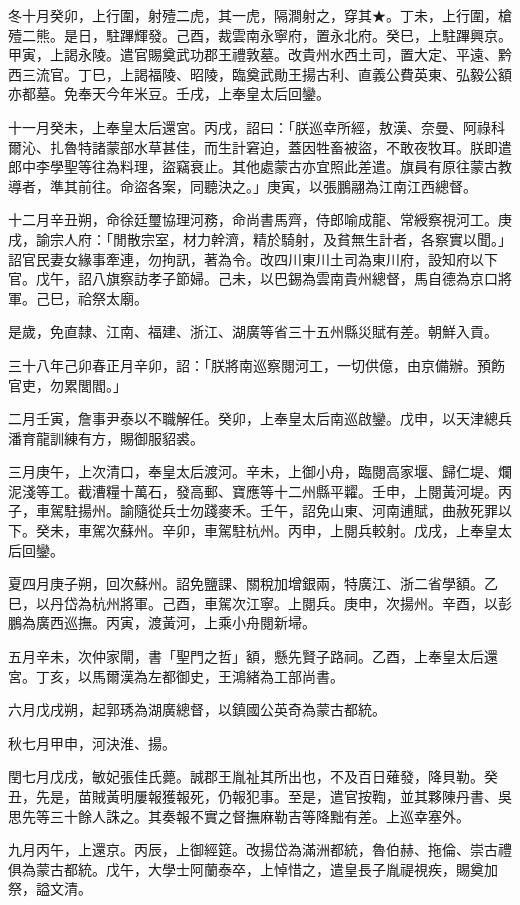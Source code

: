 \begin{pinyinscope}
冬十月癸卯，上行圍，射殪二虎，其一虎，隔澗射之，穿其★。丁未，上行圍，槍殪二熊。是日，駐蹕輝發。己酉，裁雲南永寧府，置永北府。癸巳，上駐蹕興京。甲寅，上謁永陵。遣官賜奠武功郡王禮敦墓。改貴州水西土司，置大定、平遠、黔西三流官。丁巳，上謁福陵、昭陵，臨奠武勛王揚古利、直義公費英東、弘毅公額亦都墓。免奉天今年米豆。壬戌，上奉皇太后回鑾。

十一月癸未，上奉皇太后還宮。丙戌，詔曰：「朕巡幸所經，敖漢、奈曼、阿祿科爾沁、扎魯特諸蒙部水草甚佳，而生計窘迫，蓋因牲畜被盜，不敢夜牧耳。朕即遣郎中李學聖等往為料理，盜竊衰止。其他處蒙古亦宜照此差遣。旗員有原往蒙古教導者，準其前往。命盜各案，同聽決之。」庚寅，以張鵬翮為江南江西總督。

十二月辛丑朔，命徐廷璽協理河務，命尚書馬齊，侍郎喻成龍、常綬察視河工。庚戌，諭宗人府：「閒散宗室，材力幹濟，精於騎射，及貧無生計者，各察實以聞。」詔官民妻女緣事牽連，勿拘訊，著為令。改四川東川土司為東川府，設知府以下官。戊午，詔八旗察訪孝子節婦。己未，以巴錫為雲南貴州總督，馬自德為京口將軍。己巳，祫祭太廟。

是歲，免直隸、江南、福建、浙江、湖廣等省三十五州縣災賦有差。朝鮮入貢。

三十八年己卯春正月辛卯，詔：「朕將南巡察閱河工，一切供億，由京備辦。預飭官吏，勿累閭閻。」

二月壬寅，詹事尹泰以不職解任。癸卯，上奉皇太后南巡啟鑾。戊申，以天津總兵潘育龍訓練有方，賜御服貂裘。

三月庚午，上次清口，奉皇太后渡河。辛未，上御小舟，臨閱高家堰、歸仁堤、爛泥淺等工。截漕糧十萬石，發高郵、寶應等十二州縣平糶。壬申，上閱黃河堤。丙子，車駕駐揚州。諭隨從兵士勿踐麥禾。壬午，詔免山東、河南逋賦，曲赦死罪以下。癸未，車駕次蘇州。辛卯，車駕駐杭州。丙申，上閱兵較射。戊戌，上奉皇太后回鑾。

夏四月庚子朔，回次蘇州。詔免鹽課、關稅加增銀兩，特廣江、浙二省學額。乙巳，以丹岱為杭州將軍。己酉，車駕次江寧。上閱兵。庚申，次揚州。辛酉，以彭鵬為廣西巡撫。丙寅，渡黃河，上乘小舟閱新埽。

五月辛未，次仲家閘，書「聖門之哲」額，懸先賢子路祠。乙酉，上奉皇太后還宮。丁亥，以馬爾漢為左都御史，王鴻緒為工部尚書。

六月戊戌朔，起郭琇為湖廣總督，以鎮國公英奇為蒙古都統。

秋七月甲申，河決淮、揚。

閏七月戊戌，敏妃張佳氏薨。誠郡王胤祉其所出也，不及百日薙發，降貝勒。癸丑，先是，苗賊黃明屢報獲報死，仍報犯事。至是，遣官按鞫，並其夥陳丹書、吳思先等三十餘人誅之。其奏報不實之督撫麻勒吉等降黜有差。上巡幸塞外。

九月丙午，上還京。丙辰，上御經筵。改揚岱為滿洲都統，魯伯赫、拖倫、崇古禮俱為蒙古都統。戊午，大學士阿蘭泰卒，上悼惜之，遣皇長子胤禔視疾，賜奠加祭，謚文清。


\end{pinyinscope}
